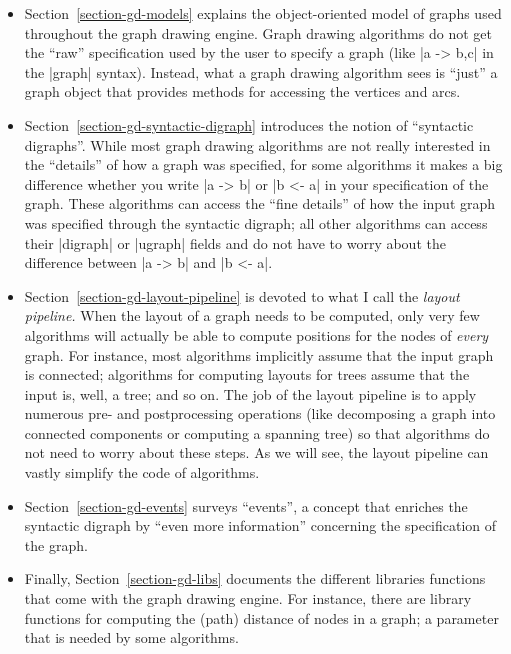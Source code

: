 \begin{itemize}
\item Section~\ref{section-gd-models} explains the object-oriented
  model of graphs used throughout the graph drawing engine. Graph
  drawing algorithms do not get the ``raw'' specification used by the
  user to specify a graph (like |{a -> {b,c}}| in the |graph|
  syntax). Instead, what a graph drawing algorithm sees is ``just'' a
  graph object that provides methods for accessing the vertices and
  arcs. 
\item Section~\ref{section-gd-syntactic-digraph} introduces the
  notion of ``syntactic digraphs''. While most graph drawing
  algorithms are not really interested in the ``details'' of how a
  graph was specified, for some algorithms it makes a big difference
  whether you write |a -> b| or |b <- a| in your specification of the
  graph. These algorithms can access the ``fine details'' of how the
  input graph was specified through the syntactic digraph; all other
  algorithms can access their |digraph| or |ugraph| fields and do not
  have to worry about the difference between |a -> b| and |b <- a|.
\item Section~\ref{section-gd-layout-pipeline} is devoted to what I
  call the \emph{layout pipeline.} When the layout of a graph needs to
  be computed, only very few algorithms will actually be able to
  compute positions for the nodes of \emph{every} graph. For instance,
  most algorithms implicitly assume that the input graph is
  connected; algorithms for computing layouts for trees assume that
  the input is, well, a tree; and so on. The job of the layout
  pipeline is to apply numerous pre- and postprocessing operations
  (like decomposing a graph into connected components or computing a
  spanning tree) so that algorithms do not need to worry about these
  steps. As we will see, the layout pipeline can vastly simplify the
  code of algorithms.
\item Section~\ref{section-gd-events} surveys ``events'', a concept
  that enriches the syntactic digraph by ``even more information''
  concerning the specification of the graph.
\item Finally, Section~\ref{section-gd-libs} documents the different
  libraries functions that come with the graph drawing engine. For
  instance, there are library functions for computing the (path)
  distance of nodes in a graph; a parameter that is needed by some
  algorithms. 
\end{itemize}



